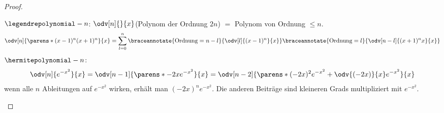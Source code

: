\begin{proof}
  \begin{proofdescription}
    \item[\ordinalnum{1} \Beh] \( \legendrepolynomial-{n}{} \): \( \odv[n]{}{x} \)(Polynom der Ordnung \( 2n \)) \( = \) Polynom von Ordnung \( \leq n \).
    \begin{equation*}
      \odv[n]{\parens*{(x-1)^n(x+1)^n}}{x}=\sum_{l=0}^{n}\braceannotate{\text{Ordnung}=n-l}{\odv[l]{(x-1)^n}{x}}\braceannotate{\text{Ordnung}=l}{\odv[n-l]{(x+1)^n{x}}{x}}
    \end{equation*}
    \( \hermitepolynomial-{n}{} \):
    \begin{equation*}
      \odv[n]{e^{-x^2}}{x}=\odv[n-1]{\parens*{-2xe^{-x^2}}}{x}=\odv[n-2]{\parens*{(-2x)^2e^{-x^2}+\odv{(-2x)}{x}e^{-x^2}}}{x}
    \end{equation*}
    \timplies wenn alle \( n \) Ableitungen auf \( e^{-x^2} \) wirken, erhält man \( (-2x)^n e^{-x^2} \). Die anderen Beiträge sind kleineren Grads multipliziert mit \( e^{-x^2} \).


\end{proofdescription}
\end{proof}
